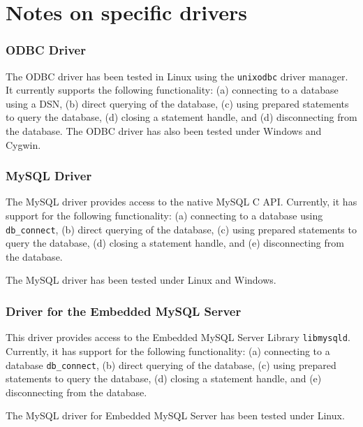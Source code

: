 \section{Notes on specific drivers}

\subsubsection{ODBC Driver}

The ODBC driver has been tested in Linux using the {\tt unixodbc} driver
manager.  It currently supports the following functionality: (a)
connecting to a database using a DSN, (b) direct querying of the database,
(c) using prepared statements to query the database, (d) closing a
statement handle, and (d) disconnecting from the database.
The ODBC driver has also been tested under Windows and Cygwin.


\subsubsection{MySQL Driver}

The MySQL driver provides access to the native MySQL C API.
Currently, it has support for the following functionality: (a) connecting
to a database using {\tt db\_connect}, (b) direct querying of
the database, (c) using prepared statements to query the database, (d) closing a
statement handle, and (e) disconnecting from the database.

The MySQL driver has been tested under Linux and Windows.


\subsubsection{Driver for the Embedded MySQL Server}

This driver provides access to the Embedded MySQL Server Library {\tt libmysqld}. Currently, it has support for the following functionality: (a) connecting
to a database {\tt db\_connect}, (b) direct querying of
the database, (c) using prepared statements to query the database, (d) closing a
statement handle, and (e) disconnecting from the database.

The MySQL driver for Embedded MySQL Server has been tested under Linux.


